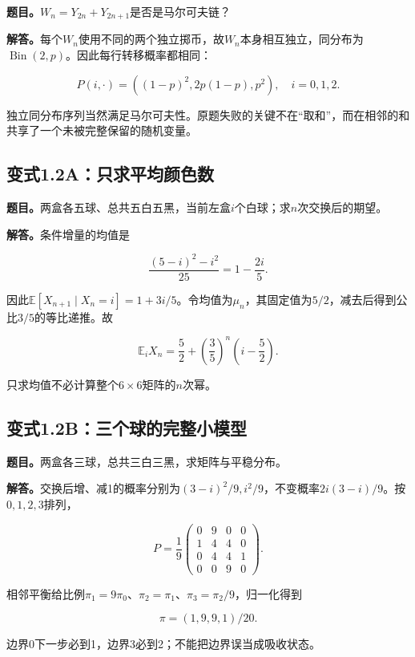 \documentclass[
  11pt,a4paper,UTF8,fontset=fandol]{ctexart}
\begin{document}
\textbf{题目。}\(W_n=Y_{2n}+Y_{2n+1}\)是否是马尔可夫链？

\textbf{解答。}每个\(W_n\)使用不同的两个独立掷币，故\(W_n\)本身相互独立，同分布为\(\operatorname{Bin}(2,p)\)。因此每行转移概率都相同：

\[\boxed{P(i,\cdot)=((1-p)^2,2p(1-p),p^2),\quad i=0,1,2.}\]

独立同分布序列当然满足马尔可夫性。原题失败的关键不在``取和''，而在相邻的和共享了一个未被完整保留的随机变量。

\subsection{变式1.2A：只求平均颜色数}\label{ux53d8ux5f0f1.2aux53eaux6c42ux5e73ux5747ux989cux8272ux6570}

\textbf{题目。}两盒各五球、总共五白五黑，当前左盒\(i\)个白球；求\(n\)次交换后的期望。

\textbf{解答。}条件增量的均值是

\[\frac{(5-i)^2-i^2}{25}=1-\frac{2i}{5}.\]

因此\(\mathbb E[X_{n+1}\mid X_n=i]=1+3i/5\)。令均值为\(\mu_n\)，其固定值为\(5/2\)，减去后得到公比\(3/5\)的等比递推。故

\[\boxed{\mathbb E_iX_n=\frac52+\left(\frac35\right)^n\left(i-\frac52\right).}\]

只求均值不必计算整个\(6\times6\)矩阵的\(n\)次幂。

\subsection{变式1.2B：三个球的完整小模型}\label{ux53d8ux5f0f1.2bux4e09ux4e2aux7403ux7684ux5b8cux6574ux5c0fux6a21ux578b}

\textbf{题目。}两盒各三球，总共三白三黑，求矩阵与平稳分布。

\textbf{解答。}交换后增、减1的概率分别为\((3-i)^2/9,i^2/9\)，不变概率\(2i(3-i)/9\)。按\(0,1,2,3\)排列，

\[P=\frac19\begin{pmatrix}0&9&0&0\\1&4&4&0\\0&4&4&1\\0&0&9&0\end{pmatrix}.\]

相邻平衡给比例\(\pi_1=9\pi_0\)、\(\pi_2=\pi_1\)、\(\pi_3=\pi_2/9\)，归一化得到

\[\boxed{\pi=(1,9,9,1)/20.}\]

边界0下一步必到1，边界3必到2；不能把边界误当成吸收状态。
\end{document}
